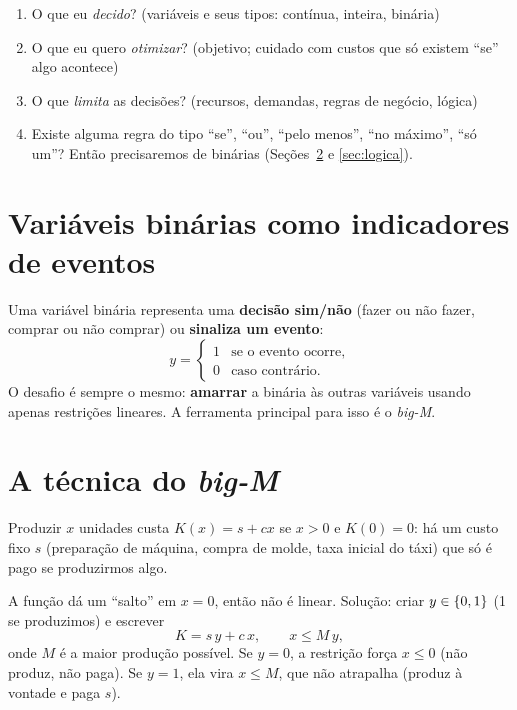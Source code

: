 \begin{receita}
\begin{enumerate}
  \item O que eu \emph{decido}? (variáveis e seus tipos: contínua, inteira, binária)
  \item O que eu quero \emph{otimizar}? (objetivo; cuidado com custos que só existem ``se'' algo acontece)
  \item O que \emph{limita} as decisões? (recursos, demandas, regras de negócio, lógica)
  \item Existe alguma regra do tipo ``se'', ``ou'', ``pelo menos'', ``no máximo'', ``só um''? Então precisaremos de
  binárias (Seções~\ref{sec:bigM} e \ref{sec:logica}).
\end{enumerate}
\end{receita}

\section{Variáveis binárias como indicadores de eventos}

Uma variável binária representa uma \textbf{decisão sim/não} (fazer ou não fazer, comprar ou não comprar) ou
\textbf{sinaliza um evento}:
\[
y = \begin{cases}1 & \text{se o evento ocorre,}\\ 0 & \text{caso contrário.}\end{cases}
\]
O desafio é sempre o mesmo: \textbf{amarrar} a binária às outras variáveis usando apenas restrições lineares. A
ferramenta principal para isso é o \emph{big-M}.

\section{A técnica do \emph{big-M}}
\label{sec:bigM}

\begin{exemplo}
Produzir $x$ unidades custa $K(x)=s+cx$ se $x>0$ e $K(0)=0$: há um custo fixo $s$ (preparação de máquina, compra de
molde, taxa inicial do táxi) que só é pago se produzirmos algo.
\begin{center}
\end{center}
A função dá um ``salto'' em $x=0$, então não é linear. Solução: criar $y\in\{0,1\}$ (1 se produzimos) e escrever
\[
K = s\,y + c\,x, \qquad x \le M\,y,
\]
onde $M$ é a maior produção possível. Se $y=0$, a restrição força $x\le 0$ (não produz, não paga). Se $y=1$, ela
vira $x\le M$, que não atrapalha (produz à vontade e paga $s$).
\end{exemplo}

